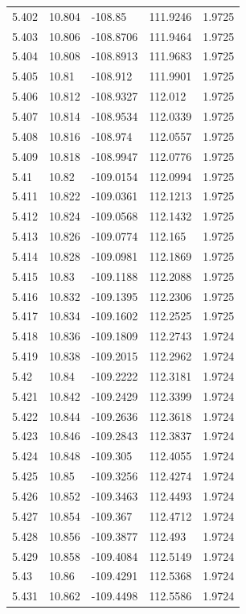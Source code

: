 \begin{tabular}{lllll}
5.402 & 10.804 & -108.85 & 111.9246 & 1.9725 \\
5.403 & 10.806 & -108.8706 & 111.9464 & 1.9725 \\
5.404 & 10.808 & -108.8913 & 111.9683 & 1.9725 \\
5.405 & 10.81 & -108.912 & 111.9901 & 1.9725 \\
5.406 & 10.812 & -108.9327 & 112.012 & 1.9725 \\
5.407 & 10.814 & -108.9534 & 112.0339 & 1.9725 \\
5.408 & 10.816 & -108.974 & 112.0557 & 1.9725 \\
5.409 & 10.818 & -108.9947 & 112.0776 & 1.9725 \\
5.41 & 10.82 & -109.0154 & 112.0994 & 1.9725 \\
5.411 & 10.822 & -109.0361 & 112.1213 & 1.9725 \\
5.412 & 10.824 & -109.0568 & 112.1432 & 1.9725 \\
5.413 & 10.826 & -109.0774 & 112.165 & 1.9725 \\
5.414 & 10.828 & -109.0981 & 112.1869 & 1.9725 \\
5.415 & 10.83 & -109.1188 & 112.2088 & 1.9725 \\
5.416 & 10.832 & -109.1395 & 112.2306 & 1.9725 \\
5.417 & 10.834 & -109.1602 & 112.2525 & 1.9725 \\
5.418 & 10.836 & -109.1809 & 112.2743 & 1.9724 \\
5.419 & 10.838 & -109.2015 & 112.2962 & 1.9724 \\
5.42 & 10.84 & -109.2222 & 112.3181 & 1.9724 \\
5.421 & 10.842 & -109.2429 & 112.3399 & 1.9724 \\
5.422 & 10.844 & -109.2636 & 112.3618 & 1.9724 \\
5.423 & 10.846 & -109.2843 & 112.3837 & 1.9724 \\
5.424 & 10.848 & -109.305 & 112.4055 & 1.9724 \\
5.425 & 10.85 & -109.3256 & 112.4274 & 1.9724 \\
5.426 & 10.852 & -109.3463 & 112.4493 & 1.9724 \\
5.427 & 10.854 & -109.367 & 112.4712 & 1.9724 \\
5.428 & 10.856 & -109.3877 & 112.493 & 1.9724 \\
5.429 & 10.858 & -109.4084 & 112.5149 & 1.9724 \\
5.43 & 10.86 & -109.4291 & 112.5368 & 1.9724 \\
5.431 & 10.862 & -109.4498 & 112.5586 & 1.9724 \\

\end{tabular}

